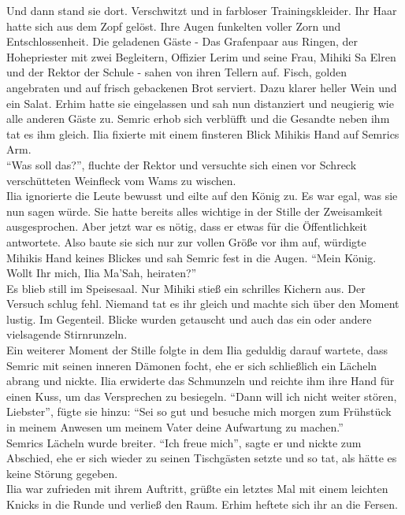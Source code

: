 Und dann stand sie dort. Verschwitzt und in farbloser Trainingskleider. Ihr Haar hatte sich aus dem 
Zopf gelöst. Ihre Augen funkelten voller Zorn und Entschlossenheit. Die geladenen Gäste - Das 
Grafenpaar aus Ringen, der Hohepriester mit zwei Begleitern, Offizier Lerim und seine Frau, Mihiki 
Sa Elren und der Rektor der Schule - sahen von ihren Tellern auf. Fisch, golden angebraten und 
auf frisch gebackenen Brot serviert. Dazu klarer heller Wein und ein Salat. Erhim hatte sie 
eingelassen und sah nun distanziert und neugierig wie alle anderen Gäste zu. Semric erhob sich 
verblüfft und die Gesandte neben ihm tat es ihm gleich. Ilia fixierte mit einem finsteren Blick 
Mihikis Hand auf Semrics Arm.\\
``Was soll das?'', fluchte der Rektor und versuchte sich einen vor Schreck verschütteten Weinfleck 
vom Wams zu wischen.\\
Ilia ignorierte die Leute bewusst und eilte auf den König zu. Es war egal, was sie nun sagen würde. 
Sie hatte bereits alles wichtige in der Stille der Zweisamkeit ausgesprochen. Aber jetzt war es 
nötig, dass er etwas für die Öffentlichkeit antwortete. Also baute sie sich nur zur vollen 
Größe vor ihm auf, würdigte Mihikis Hand keines Blickes und sah Semric fest in die Augen. ``Mein 
König. Wollt Ihr mich, Ilia Ma'Sah, heiraten?''\\
Es blieb still im Speisesaal. Nur Mihiki stieß ein schrilles Kichern aus. Der Versuch schlug fehl. 
Niemand tat es ihr gleich und machte sich über den Moment lustig. Im Gegenteil. Blicke wurden 
getauscht und auch das ein oder andere vielsagende Stirnrunzeln.\\
Ein weiterer Moment der Stille folgte in dem Ilia geduldig darauf wartete, dass Semric mit seinen 
inneren Dämonen focht, ehe er sich schließlich ein Lächeln abrang und nickte. Ilia erwiderte das 
Schmunzeln und reichte ihm ihre Hand für einen Kuss, um das Versprechen zu besiegeln. ``Dann will 
ich nicht weiter stören, Liebster'', fügte sie hinzu: ``Sei so gut und besuche mich morgen zum 
Frühstück in meinem Anwesen um meinem Vater deine Aufwartung zu machen.''\\
Semrics Lächeln wurde breiter. ``Ich freue mich'', sagte er und nickte zum Abschied, ehe er sich 
wieder zu seinen Tischgästen setzte und so tat, als hätte es keine Störung gegeben.\\
Ilia war zufrieden mit ihrem Auftritt, grüßte ein letztes Mal mit einem leichten Knicks in die 
Runde und verließ den Raum. Erhim heftete sich ihr an die Fersen.\\
